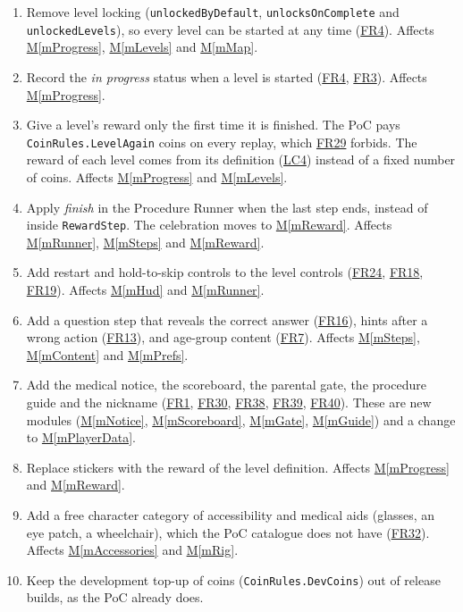 \documentclass[12pt, titlepage]{article}
\newcommand{\mref}[1]{\hyperref[#1]{M\ref*{#1}}}
\newcommand{\srsurl}{https://team-hindsight.github.io/ophthamology-game/SRS/SRS.pdf}
\newcommand{\srsfrref}[2]{\href{\srsurl\#nameddest=#1}{FR#2}}
\newcommand{\srsitemref}[2]{\href{\srsurl\#nameddest=#1}{#2}}
\begin{document}
\begingroup\sloppy
\begin{enumerate}
\item Remove level locking (\texttt{unlockedByDefault},
  \texttt{unlocksOnComplete} and \texttt{unlockedLevels}), so every level can be
  started at any time (\srsfrref{FR_StartLevel}{4}). Affects \mref{mProgress},
  \mref{mLevels} and \mref{mMap}.
\item Record the \emph{in progress} status when a level is started
  (\srsfrref{FR_StartLevel}{4}, \srsfrref{FR_JourneyMap}{3}). Affects
  \mref{mProgress}.
\item Give a level's reward only the first time it is finished. The PoC pays
  \texttt{CoinRules.LevelAgain} coins on every replay, which
  \srsfrref{FR_NoDuplicateReward}{29} forbids. The reward of each level comes
  from its definition (\srsitemref{LC_Rewards}{LC4}) instead of a fixed number of
  coins. Affects \mref{mProgress} and \mref{mLevels}.
\item Apply \emph{finish} in the Procedure Runner when the last step ends,
  instead of inside \texttt{RewardStep}. The celebration moves to
  \mref{mReward}. Affects \mref{mRunner}, \mref{mSteps} and \mref{mReward}.
\item Add restart and hold-to-skip controls to the level controls
  (\srsfrref{FR_RestartLevel}{24}, \srsfrref{FR_NoPenalty}{18},
  \srsfrref{FR_IgnoreRepeatedTouches}{19}). Affects \mref{mHud} and
  \mref{mRunner}.
\item Add a question step that reveals the correct answer
  (\srsfrref{FR_RevealAnswer}{16}), hints after a wrong action
  (\srsfrref{FR_HintOnMiss}{13}), and age-group content
  (\srsfrref{FR_AgeGroup}{7}). Affects \mref{mSteps}, \mref{mContent} and
  \mref{mPrefs}.
\item Add the medical notice, the scoreboard, the parental gate, the procedure
  guide and the nickname (\srsfrref{FR_MedicalNotice}{1},
  \srsfrref{FR_Scoreboard}{30}, \srsfrref{FR_ParentGate}{38},
  \srsfrref{FR_ProcedureGuide}{39}, \srsfrref{FR_Nickname}{40}). These are new
  modules (\mref{mNotice}, \mref{mScoreboard}, \mref{mGate}, \mref{mGuide}) and
  a change to \mref{mPlayerData}.
\item Replace stickers with the reward of the level definition. Affects
  \mref{mProgress} and \mref{mReward}.
\item Add a free character category of accessibility and medical aids
  (glasses, an eye patch, a wheelchair), which the PoC catalogue does not have
  (\srsfrref{FR_DiverseCharacters}{32}). Affects \mref{mAccessories} and
  \mref{mRig}.
\item Keep the development top-up of coins (\texttt{CoinRules.DevCoins}) out of
  release builds, as the PoC already does.
\end{enumerate}
\endgroup
\end{document}
